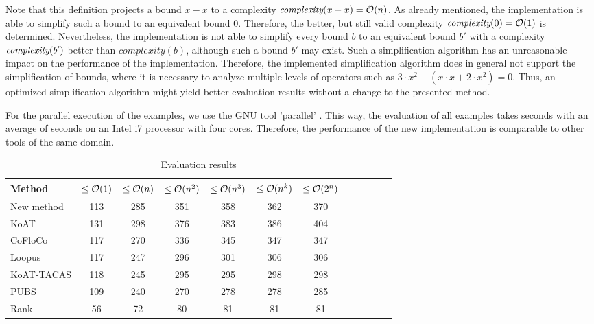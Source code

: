 Note that this definition projects a bound $x-x$ to a complexity $\emph{complexity}(x-x) = \mathcal{O}(n)$.
As already mentioned, the implementation is able to simplify such a bound to an equivalent bound $0$.
Therefore, the better, but still valid complexity $\emph{complexity}(0) = \mathcal{O}(1)$ is determined.
Nevertheless, the implementation is not able to simplify every bound $b$ to an equivalent bound $b'$ with a complexity $\emph{complexity}(b')$ better than $complexity(b)$, although such a bound $b'$ may exist.
Such a simplification algorithm has an unreasonable impact on the performance of the implementation.
Therefore, the implemented simplification algorithm does in general not support the simplification of bounds, where it is necessary to analyze multiple levels of operators such as $3 \cdot x^2-(x \cdot x+2 \cdot x^2) = 0$.
Thus, an optimized simplification algorithm might yield better evaluation results without a change to the presented method.

For the parallel execution of the examples, we use the GNU tool 'parallel' \cite{gnuparallel}.
This way, the evaluation of all examples takes  seconds with an average of  seconds on an Intel i7 processor with four cores.
Therefore, the performance of the new implementation is comparable to other tools of the same domain.

\begin{table}
  \begin{center}
    \label{tab:evaluation}
    \begin{tabular}{l|c|c|c|c|c|c|c|c|c|c|c}
      Method & $\leq\mathcal{O}(1)$ & $\leq\mathcal{O}(n)$ & $\leq\mathcal{O}(n^2)$ & $\leq\mathcal{O}(n^3)$ & $\leq\mathcal{O}(n^k)$ & $\leq\mathcal{O}(2^n)$\\
      \hline
      New method & 113 & 285 & 351 & 358 & 362 & 370 \\
      KoAT       & 131 & 298 & 376 & 383 & 386 & 404 \\
      CoFloCo    & 117 & 270 & 336 & 345 & 347 & 347 \\
      Loopus     & 117 & 247 & 296 & 301 & 306 & 306 \\
      KoAT-TACAS & 118 & 245 & 295 & 295 & 298 & 298 \\
      PUBS       & 109 & 240 & 270 & 278 & 278 & 285 \\
      Rank       & 56  &  72 &  80 &  81 &  81 &  81 \\
    \end{tabular}
  \end{center}
  \caption{Evaluation results}
\end{table}

